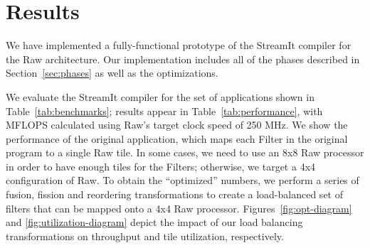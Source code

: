 \section{Results}
\label{sec:results}

We have implemented a fully-functional prototype of the StreamIt
compiler for the Raw architecture.  Our implementation includes all of
the phases described in Section~\ref{sec:phases} as well as the
optimizations.

%
%
%







We evaluate the StreamIt compiler for the set of applications shown in
Table~\ref{tab:benchmarks}; results appear in
Table~\ref{tab:performance}, with MFLOPS calculated using Raw's target
clock speed of 250 MHz.  We show the performance of the original
application, which maps each Filter in the original program to a
single Raw tile.  In some cases, we need to use an 8x8 Raw processor
in order to have enough tiles for the Filters; otherwise, we target a
4x4 configuration of Raw.  To obtain the ``optimized'' numbers, we
perform a series of fusion, fission and reordering transformations to
create a load-balanced set of filters that can be mapped onto a 4x4
Raw processor.  Figures~\ref{fig:opt-diagram} and
\ref{fig:utilization-diagram} depict the impact of our load balancing
transformations on throughput and tile utilization, respectively.

